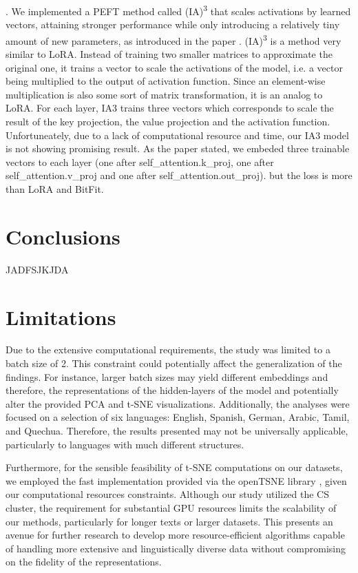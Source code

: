 \documentclass[11pt]{article}
\newcommand{\customsection}[1]{
  \noindent\textbf{#1}.\vspace{2mm}
}
\begin{document}
\customsection{} We implemented a PEFT method called (IA)\textsuperscript{3} that scales activations by learned vectors, attaining stronger performance while only introducing a relatively tiny amount of new parameters, as introduced in the paper \cite{liu2022fewshot}.
(IA)\textsuperscript{3} is a method very similar to LoRA. Instead of training two smaller matrices to approximate the original one,
it trains a vector to scale the activations of the model, i.e. a vector being multiplied to the output of activation function.
Since an element-wise multiplication is also some sort of matrix transformation, it is an analog to LoRA.
For each layer, IA3 trains three vectors which corresponds to scale the result of the key projection, the value projection and the activation function.
Unfortuneately, due to a lack of computational resource and time, our IA3 model is not showing promising result.
As the paper stated, we embeded three trainable vectors to each layer (one after self_attention.k_proj, one after self_attention.v_proj and one after self_attention.out_proj).
but the loss is more than LoRA and BitFit.

\section{Conclusions}

JADFSJKJDA

\section*{Limitations}
Due to the extensive computational requirements, the study was limited to a batch size of 2. This constraint could potentially affect the generalization of the findings. For instance, larger batch sizes may yield different embeddings and therefore, the representations of the hidden-layers of the model and potentially alter the provided PCA and t-SNE visualizations. Additionally, the analyses were focused on a selection of six languages: English, Spanish, German, Arabic, Tamil, and Quechua. Therefore, the results presented may not be universally applicable, particularly to languages with much different structures.

Furthermore, for the sensible feasibility of t-SNE computations on our datasets, we employed the fast implementation provided via the openTSNE library \cite{opentsne}, given our computational resources constraints. Although our study utilized the CS cluster, the requirement for substantial GPU resources limits the scalability of our methods, particularly for longer texts or larger datasets. This presents an avenue for further research to develop more resource-efficient algorithms capable of handling more extensive and linguistically diverse data without compromising on the fidelity of the representations.
\end{document}

